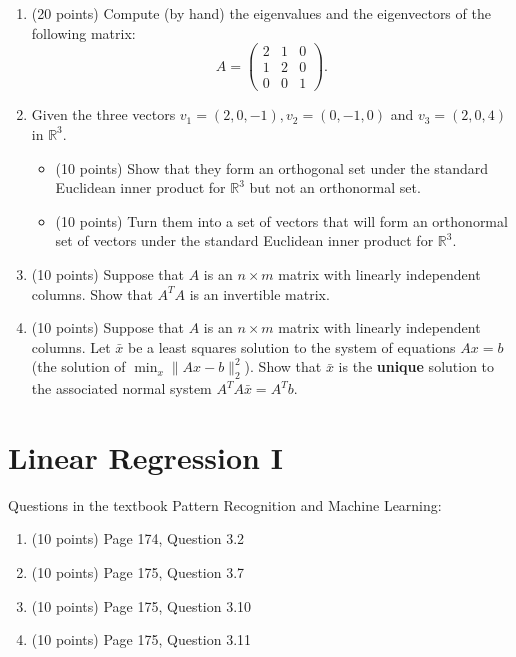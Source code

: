 \documentclass[11pt]{article}
\begin{document}
\begin{enumerate}
\item (20 points) Compute (by hand) the eigenvalues and the eigenvectors of the following matrix:
$$A = \begin{pmatrix} 2 & 1 & 0 \\ 1 & 2& 0\\ 0 & 0 & 1 \end{pmatrix}.$$
\item Given the three vectors $v_1 = (2, 0, -1), v_2 = (0, -1, 0)$ and $v_3 = (2, 0, 4)$ in $\mathbb R^3$.
\begin{itemize}
\item (10 points) Show that they form an orthogonal set under the standard 
      Euclidean inner product for $\mathbb R^3$ but not an orthonormal set. 
\item (10 points) Turn them into a set of vectors that will form an orthonormal set of 
      vectors under the standard Euclidean inner product for $\mathbb R^3$. 
\end{itemize}

\item (10 points) Suppose that $A$ is an $n \times m$ matrix with linearly independent columns.
      Show that $A^T A$ is an invertible matrix. 

\item (10 points) Suppose that $A$ is an $n \times m$ matrix with linearly independent columns.
      Let $\bar x$ be a least squares solution to the system of equations $Ax = b$ (the solution of $\min_x \|Ax - b\|_2^2$).
      Show that $\bar x$ is the \textbf{unique} solution to the associated normal system 
      $A^T A \bar x = A^T b$. 

\end{enumerate}


\section{Linear Regression I} 

Questions in the textbook Pattern Recognition and Machine Learning:
\begin{enumerate}
\item (10 points) Page 174, Question 3.2
\item (10 points) Page 175, Question 3.7
\item (10 points) Page 175, Question 3.10
\item (10 points) Page 175, Question 3.11
\end{enumerate}
\end{document}
